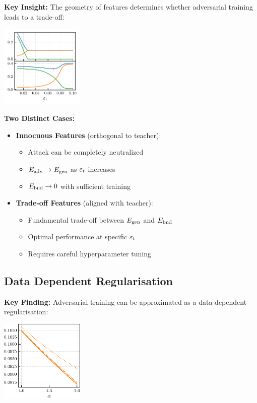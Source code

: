\documentclass[a0paper,fleqn]{betterportraitposter}
\theoremstyle{plain}
\theoremstyle{definition}
\theoremstyle{remark}
\begin{document}
{\begin{multicols}{3}
\textbf{Key Insight:} The geometry of features determines whether adversarial training leads to a trade-off:

\begin{center}
\includegraphics[width=0.3\textwidth]{Assets/optimal_defense.pdf}
\end{center}

\textbf{Two Distinct Cases:}

\begin{itemize}
    \item \textbf{Innocuous Features} (orthogonal to teacher):
    \begin{itemize}
        \item Attack can be completely neutralized
        \item $E_{\mathrm{adv}} \to E_{\mathrm{gen}}$ as $\varepsilon_t$ increases
        \item $E_{\mathrm{bnd}} \to 0$ with sufficient training
    \end{itemize}
    
    \item \textbf{Trade-off Features} (aligned with teacher):
    \begin{itemize}
        \item Fundamental trade-off between $E_{\mathrm{gen}}$ and $E_{\mathrm{bnd}}$
        \item Optimal performance at specific $\varepsilon_t$
        \item Requires careful hyperparameter tuning
    \end{itemize}
\end{itemize}

\subsection{Data Dependent Regularisation}

\textbf{Key Finding:} Adversarial training can be approximated as a data-dependent regularisation:

\begin{center}
    \includegraphics[width=0.3\textwidth]{Assets/gen_lambda_optimal_sweep_alpha.pdf}
\end{center}


\end{multicols}}
\end{document}
